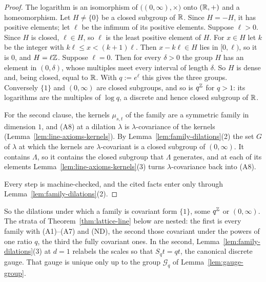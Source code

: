 \begin{proof}
The logarithm is an isomorphism of $\bigl((0,\infty),\times\bigr)$ onto $(\mathbb{R},+)$ and a
homeomorphism. Let $H \ne \{0\}$ be a closed subgroup of $\mathbb{R}$. Since $H = -H$, it has positive
elements; let $\ell$ be the infimum of its positive elements. Suppose $\ell > 0$. Since $H$ is
closed, $\ell \in H$, so $\ell$ is the least positive element of $H$. For $x \in H$ let $k$ be
the integer with
$k\ell \le x < (k+1)\ell$. Then $x - k\ell \in H$ lies in $[0, \ell)$, so it is $0$, and
$H = \ell\mathbb{Z}$. Suppose $\ell = 0$. Then for every $\delta > 0$ the group $H$ has an element in
$(0,\delta)$, whose multiples meet every interval of length $\delta$. So $H$ is dense and, being
closed, equal to $\mathbb{R}$. With $q := e^\ell$ this gives the three groups. Conversely $\{1\}$ and
$(0,\infty)$ are closed subgroups, and so is $q^{\mathbb{Z}}$ for $q > 1$: its logarithms are the
multiples of $\log q$, a discrete and hence closed subgroup of $\mathbb{R}$.

For the second clause, the kernels $\mu_{s,t}$ of the family are a symmetric family in dimension
$1$, and (A8) at a dilation $\lambda$ is $\lambda$-covariance of the kernels
(Lemma~\ref{lem:line-axioms-kernels}). By Lemma~\ref{lem:family-dilations}(2) the set $G$ of
$\lambda$ at which the kernels are $\lambda$-covariant is a closed subgroup of $(0,\infty)$. It
contains $\Lambda$, so it contains the closed subgroup that $\Lambda$ generates, and at each of
its elements Lemma~\ref{lem:line-axioms-kernels}(3) turns $\lambda$-covariance back into (A8).

Every step is machine-checked, and the cited facts enter only through
Lemma~\ref{lem:family-dilations}(2).
\end{proof}

So the dilations under which a family is covariant form $\{1\}$, some $q^{\mathbb{Z}}$ or $(0,\infty)$.
The strata of Theorem~\ref{thm:lattice-line} below are nested: the first is every family with
(A1)--(A7) and (ND), the second those covariant under the powers of one ratio $q$, the third the
fully covariant ones. In the second, Lemma~\ref{lem:family-dilations}(3) at $d = 1$ relabels the scales so that $S_qt = qt$, the
canonical discrete gauge. That gauge is unique only up to the group $\mathcal{G}_q$ of
Lemma~\ref{lem:gauge-group}.


